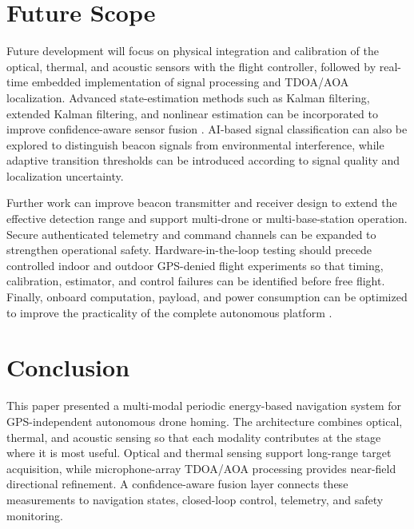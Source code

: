 \documentclass[conference]{IEEEtran}
\begin{document}

\section{Future Scope}

Future development will focus on physical integration and calibration of the
optical, thermal, and acoustic sensors with the flight controller, followed by
real-time embedded implementation of signal processing and TDOA/AOA
localization. Advanced state-estimation methods such as Kalman filtering,
extended Kalman filtering, and nonlinear estimation can be incorporated to
improve confidence-aware sensor fusion
\cite{welch1995,arun2020}. AI-based signal classification can also be explored
to distinguish beacon signals from environmental interference, while adaptive
transition thresholds can be introduced according to signal quality and
localization uncertainty.

Further work can improve beacon transmitter and receiver design to extend the
effective detection range and support multi-drone or multi-base-station
operation. Secure authenticated telemetry and command channels can be expanded
to strengthen operational safety. Hardware-in-the-loop testing should precede
controlled indoor and outdoor GPS-denied flight experiments so that timing,
calibration, estimator, and control failures can be identified before free
flight. Finally, onboard computation, payload, and power consumption can be
optimized to improve the practicality of the complete autonomous platform
\cite{faessler2018,px4guide,ros2design}.


\section{Conclusion}

This paper presented a multi-modal periodic energy-based navigation system for
GPS-independent autonomous drone homing. The architecture combines optical,
thermal, and acoustic sensing so that each modality contributes at the stage
where it is most useful. Optical and thermal sensing support long-range target
acquisition, while microphone-array TDOA/AOA processing provides near-field
directional refinement. A confidence-aware fusion layer connects these
measurements to navigation states, closed-loop control, telemetry, and safety
monitoring.
\end{document}
